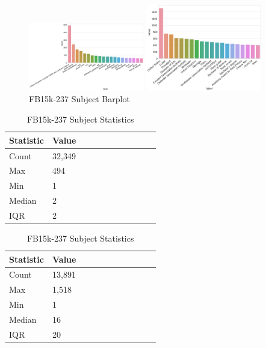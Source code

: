 
\begin{figure}[H]
	\parbox{.5\linewidth}{
   		\caption{WN18RR Subject Barplot}
   		\centering
    		\includegraphics[width=0.45\textwidth, height=0.2\textheight]{WN18RR_Subject_Counts}
		}
	\hfill
	\parbox{.5\linewidth}{
		\caption{FB15k-237 Subject Barplot}
   		\centering
		\includegraphics[width=0.45\textwidth, height=0.2\textheight]{FB15k-237_Subject_Counts}
		}
\end{figure}


\begin{table}[H]
	\parbox{.5\linewidth}{
		\caption{WN18RR Subject Statistics}
		\centering
		\begin{tabular}{lllllllllll}
  			\textbf{Statistic} & \textbf{Value}  \\
  			\hline
			Count & 32,349 \\
			Max & 494 \\
			Min & 1 \\
  			Median & 2 \\
  			IQR & 2 \\
		\end{tabular}
		}
	\hfill
	\parbox{.5\linewidth}{
		\caption{FB15k-237 Subject Statistics}
		\centering
		\begin{tabular}{lllllllllll}
  			\textbf{Statistic} & \textbf{Value}  \\
  			\hline
			Count &13,891 \\
			Max & 1,518 \\
			Min & 1 \\
  			Median & 16 \\
  			IQR & 20 \\
		\end{tabular}
		}
\end{table}

